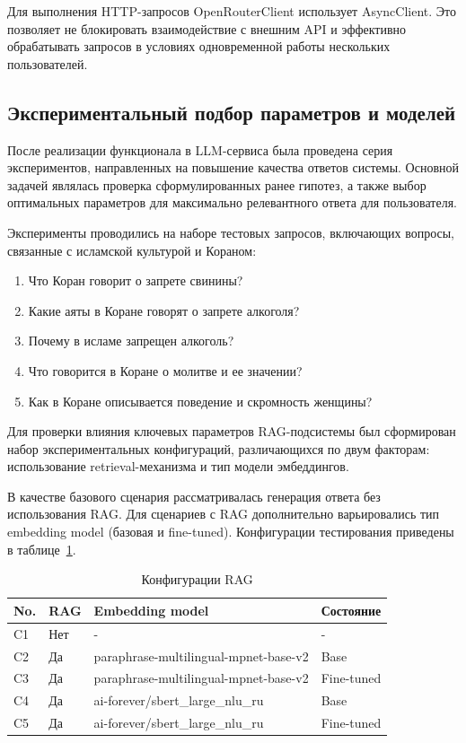 Для выполнения HTTP-запросов OpenRouterClient использует  AsyncClient. Это позволяет не блокировать взаимодействие с внешним API и эффективно обрабатывать запросов в условиях одновременной работы нескольких пользователей.


\subsection{Экспериментальный подбор параметров и моделей}


После реализации функционала в LLM-сервиса была проведена серия экспериментов, направленных на повышение качества ответов системы. Основной задачей являлась проверка сформулированных ранее гипотез, а также выбор оптимальных параметров для максимально релевантного ответа для пользователя.


Эксперименты проводились на наборе тестовых запросов, включающих вопросы, связанные с исламской культурой и Кораном:

\begin{enumerate}
	\item Что Коран говорит о запрете свинины?
	\item Какие аяты в Коране говорят о запрете алкоголя?
	\item Почему в исламе запрещен алкоголь?
	\item Что говорится в Коране о молитве и ее значении?
	\item Как в Коране описывается поведение и скромность женщины?
\end{enumerate}

Для проверки влияния ключевых параметров RAG-подсистемы был сформирован набор экспериментальных конфигураций, различающихся по двум факторам: использование retrieval-механизма и тип модели эмбеддингов.


В качестве базового сценария рассматривалась генерация ответа без использования RAG. Для сценариев с RAG дополнительно варьировались тип embedding model (базовая и fine-tuned). Конфигурации тестирования приведены в таблице~\ref{tab:rag-configs}.


\begin{table}[H]
	\centering
	\caption{Конфигурации RAG}
	\label{tab:rag-configs}
	\small
	\begin{tabular}{|p{1.0cm}|p{1.2cm}|p{9.5cm}|p{2.73cm}|}
	\hline
		No. & RAG & Embedding model & Состояние \\
	\hline
		C1 & Нет & - & - \\
	\hline
		C2 & Да & paraphrase-multilingual-mpnet-base-v2 & Base \\
	\hline
		C3 & Да & paraphrase-multilingual-mpnet-base-v2 & Fine-tuned \\
	\hline
		C4 & Да & ai-forever/sbert\_large\_nlu\_ru & Base \\
	\hline
		C5 & Да & ai-forever/sbert\_large\_nlu\_ru & Fine-tuned \\
	\hline
	\end{tabular}
\end{table}

